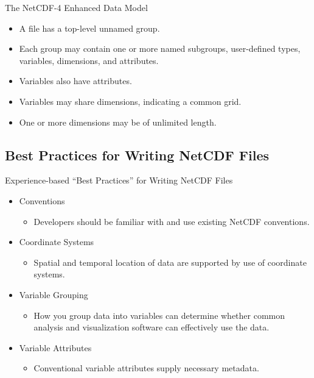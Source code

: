 \documentclass[compress,11pt,xcolor=svgnames,aspectratio=169]{beamer}
\begin{document}
\begin{frame}[t]{The NetCDF-4 Enhanced Data Model}

    \begin{itemize}
    \setlength\itemsep{0.5cm}
        \item A file has a top-level unnamed group.
        \item Each group may contain one or more named subgroups, user-defined types, variables, dimensions, and attributes.
        \item Variables also have attributes.
        \item Variables may share dimensions, indicating a common grid.
        \item One or more dimensions may be of unlimited length.
    \end{itemize}

\nocite{netcdf}

\end{frame}

\subsection{Best Practices for Writing NetCDF Files}

\begin{frame}[t]{Experience-based ``Best Practices'' for Writing NetCDF Files}

    \begin{itemize}
    \setlength\itemsep{0.4cm}

        \item	Conventions
        \begin{itemize}
          \item Developers should be familiar with and use existing NetCDF conventions.
        \end{itemize}

        \item	Coordinate Systems
        \begin{itemize}
          \item Spatial and temporal location of data are supported by use of coordinate systems.
        \end{itemize}

        \item	Variable Grouping
        \begin{itemize}
          \item How you group data into variables can determine whether common analysis and visualization software can effectively use the data.
        \end{itemize}

        \item	Variable Attributes
        \begin{itemize}
          \item Conventional variable attributes supply necessary metadata.
        \end{itemize}

    \end{itemize}

\nocite{netcdf}

\end{frame}
\end{document}
